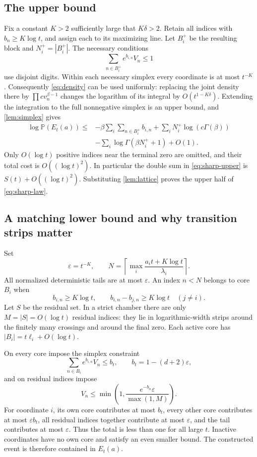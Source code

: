 \documentclass[11pt,a4paper]{article}
\theoremstyle{definition}
\theoremstyle{remark}
\newcommand{\PP}{\mathbb P}
\numberwithin{equation}{section}
\begin{document}
\subsection{The upper bound}
Fix a constant $K>2$ sufficiently large that $K\delta>2$. Retain all
indices with $b_n\ge K\log t$, and assign each to its maximizing line.
Let $B_i^+$ be the resulting block and $N_i^+=|B_i^+|$. The necessary
conditions
\[
 \sum_{n\in B_i^+}e^{b_{i,n}}V_n\le1
\]
use disjoint digits. Within each necessary simplex every coordinate is at
most $t^{-K}$. Consequently \eqref{eq:density} can be used uniformly:
replacing the joint density there by $\prod c v_n^{\beta-1}$ changes the
logarithm of its integral by $O(t^{1-K\delta})$. Extending the integration
to the full nonnegative simplex is an upper bound, and
\cref{lem:simplex} gives
\begin{equation}
 \begin{split}
 \log\PP(E_t(a))\le{}&-\beta\sum_{i}\sum_{n\in B_i^+}b_{i,n}
 +\sum_iN_i^+\log(c\Gamma(\beta))\\
 &-\sum_i\log\Gamma(\beta N_i^++1)+O(1).
 \end{split}
 \label{eq:sharp-upper}
\end{equation}
Only $O(\log t)$ positive indices near the terminal zero are omitted,
and their total cost is $O((\log t)^2)$. In particular the double sum in
\eqref{eq:sharp-upper} is $S(t)+O((\log t)^2)$. Substituting
\cref{lem:lattice} proves the upper half of \eqref{eq:sharp-law}.

\subsection{A matching lower bound and why transition strips matter}
Set
\[
 \varepsilon=t^{-K},\qquad
 N=\left\lceil\max_i\frac{a_it+K\log t}{\lambda_i}\right\rceil.
\]
All normalized deterministic tails are at most $\varepsilon$. An index
$n<N$ belongs to core $B_i$ when
\begin{equation}
 b_{i,n}\ge K\log t,\qquad
 b_{i,n}-b_{j,n}\ge K\log t\quad(j\ne i).
 \label{eq:cores}
\end{equation}
Let $S$ be the residual set. In a strict chamber there are only
$M=|S|=O(\log t)$ residual indices: they lie in logarithmic-width strips
around the finitely many crossings and around the final zero. Each active
core has $|B_i|=t\ell_i+O(\log t)$.

On every core impose the simplex constraint
\[
 \sum_{n\in B_i}e^{b_{i,n}}V_n\le b_t,
 \qquad b_t=1-(d+2)\varepsilon,
\]
and on residual indices impose
\begin{equation}
 V_n\le\min\left(1,\frac{e^{-b_n}\varepsilon}{\max(1,M)}\right).
 \label{eq:strip-caps}
\end{equation}
For coordinate $i$, its own core contributes at most $b_t$, every other
core contributes at most $\varepsilon b_t$, all residual indices together
contribute at most $\varepsilon$, and the tail contributes at most
$\varepsilon$. Thus the total is less than one for all large $t$.
Inactive coordinates have no own core and satisfy an even smaller bound.
The constructed event is therefore contained in $E_t(a)$.
\end{document}
